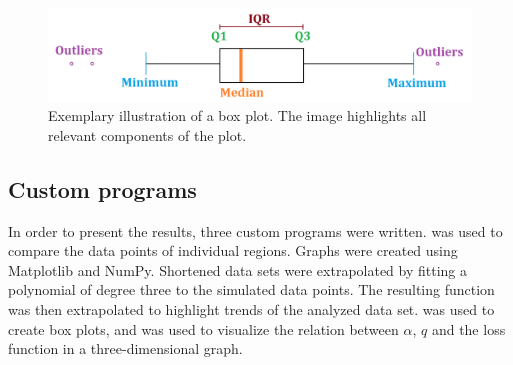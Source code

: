 \begin{figure}
	\begin{center}
		\includegraphics[width=\textwidth]{./figures/boxplot.png}
		\caption[Exemplary illustration of a box plot]{Exemplary illustration of a box plot. The image highlights all relevant
			components of the plot.}
		\label{fig:boxplot}
	\end{center}
\end{figure}


\subsection{Custom programs}
In order to present the results, three custom programs were written.  was used to compare the data points of
individual regions. Graphs were created using Matplotlib and NumPy. Shortened data sets were extrapolated by fitting a polynomial
of degree three to the simulated data points. The resulting function was then extrapolated to highlight trends of the
analyzed data set.  was used to create box plots, and  was used to visualize the
relation between $\alpha$, $q$ and the loss function in a three-dimensional graph.
